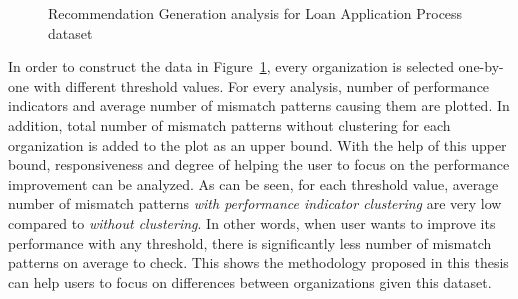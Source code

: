 \begin{itemize}
\begin{figure}
    	\caption{Recommendation Generation analysis for Loan Application Process dataset}
      \label{fig:loan-recommendation-generation-analysis}
    \end{figure}
  In order to construct the data in Figure~\ref{fig:loan-recommendation-generation-analysis}, every organization is selected one-by-one with different threshold values. For every analysis, number of performance indicators and average number of mismatch patterns causing them are plotted. In addition, total number of mismatch patterns without clustering for each organization is added to the plot as an upper bound. With the help of this upper bound, responsiveness and degree of helping the user to focus on the performance improvement can be analyzed. As can be seen, for each threshold value, average number of mismatch patterns \textit{with performance indicator clustering} are very low compared to \textit{without clustering}. In other words, when user wants to improve its performance with any threshold, there is significantly less number of mismatch patterns on average to check. This shows the methodology proposed in this thesis can help users to focus on differences between organizations given this dataset.
\end{itemize}